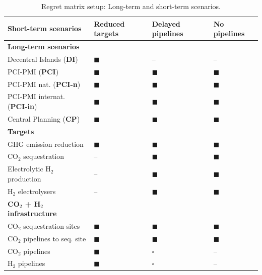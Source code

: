\documentclass[pdflatex,sn-nature]{sn-jnl}%
\theoremstyle{thmstyleone}%
\theoremstyle{thmstyletwo}%
\theoremstyle{thmstylethree}%
\begin{document}
\begin{table}[htbp]
  \centering
  \caption{Regret matrix setup: Long-term and short-term scenarios.}
  \label{tab:regret_matrix_setup}
  \scriptsize
  \begin{tabularx}{\linewidth}{R{4.2cm}>{\centering\arraybackslash}X>{\centering\arraybackslash}X>{\centering\arraybackslash}X}
    \toprule
    \textbf{Short-term scenarios} & \textbf{Reduced targets} & \textbf{Delayed pipelines} & \textbf{No pipelines} \\
    \midrule
    \textbf{Long-term scenarios} & & & \\
    Decentral Islands (\textbf{DI}) & $\blacksquare$ & -- & -- \\
    PCI-PMI (\textbf{PCI}) & $\blacksquare$ & $\blacksquare$ & $\blacksquare$ \\
    PCI-PMI nat. (\textbf{PCI-n}) & $\blacksquare$ & $\blacksquare$ & $\blacksquare$\\
    PCI-PMI internat. (\textbf{PCI-in}) & $\blacksquare$ & $\blacksquare$ & $\blacksquare$ \\
    Central Planning (\textbf{CP}) & $\blacksquare$ & $\blacksquare$ & $\blacksquare$ \\
    \midrule
    \textbf{Targets} & & & \\
    GHG emission reduction &  $\blacksquare$ &  $\blacksquare$ &  $\blacksquare$ \\
    CO$_2$ sequestration &  -- &  $\blacksquare$ &  $\blacksquare$ \\
    Electrolytic H$_2$ production &  -- &  $\blacksquare$ &  $\blacksquare$ \\
    H$_2$ electrolysers &  -- &  $\blacksquare$ &  $\blacksquare$ \\
    \midrule
    \textbf{CO$_2$ + H$_2$ infrastructure} & & & \\
    CO$_2$ sequestration sites & $\blacksquare$ &  $\blacksquare$ &  $\blacksquare$ \\
    CO$_2$ pipelines to seq. site & $\blacksquare$ &  $\blacksquare$ &  $\blacksquare$ \\
    CO$_2$ pipelines & $\blacksquare$ &  $\square$ &  -- \\
    H$_2$ pipelines & $\blacksquare$ &  $\square$ &  -- \\
    \bottomrule
  \end{tabularx}
  \centering
\end{table}
\end{document}
